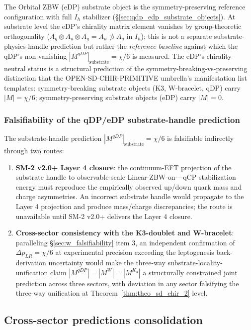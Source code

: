 \documentclass[11pt,letterpaper]{article}
\newcommand{\Kthree}{\ensuremath{K_3}}
\newcommand{\DeltapLR}{\Delta p_{LR}}
\begin{document}
The Orbital ZBW (eDP) substrate object is the symmetry-preserving reference configuration with full $I_h$ stabilizer (\S\ref{sec:qdp_edp_substrate_objects}). At substrate level the eDP's chirality matrix element vanishes by group-theoretic orthogonality ($A_g \otimes A_u \otimes A_g = A_u \not\supset A_g$ in $I_h$); this is not a separate substrate-physics-handle prediction but rather the \emph{reference baseline} against which the qDP's non-vanishing $|M^{qDP}|_{\text{substrate}} = \chi/6$ is measured. The eDP's chirality-neutral status is a structural prediction of the symmetry-breaking-vs-preserving distinction that the OPEN-SD-CHIR-PRIMITIVE umbrella's manifestation list templates: symmetry-breaking substrate objects (K3, W-bracelet, qDP) carry $|M| = \chi/6$; symmetry-preserving substrate objects (eDP) carry $|M| = 0$.

\subsubsection{Falsifiability of the qDP/eDP substrate-handle prediction}\label{sec:qdp_falsifiability}

The substrate-handle prediction $|M^{qDP}|_{\text{substrate}} = \chi/6$ is falsifiable indirectly through two routes:

\begin{enumerate}\setlength\itemsep{0.3em}
    \item \textbf{SM-2 v2.0+ Layer 4 closure}: the continuum-EFT projection of the substrate handle to observable-scale Linear-ZBW-on-$-$qCP stabilization energy must reproduce the empirically observed up/down quark mass and charge asymmetries. An incorrect substrate handle would propagate to the Layer 4 projection and produce mass/charge discrepancies; the route is unavailable until SM-2 v2.0+ delivers the Layer 4 closure.
    \item \textbf{Cross-sector consistency with the K3-doublet and W-bracelet}: paralleling \S\ref{sec:w_falsifiability} item 3, an independent confirmation of $\DeltapLR = \chi/6$ at experimental precision exceeding the leptogenesis back-derivation uncertainty would make the three-way substrate-locality-unification claim $|M^{qDP}| = |M^W| = |M^{\Kthree}|$ a structurally constrained joint prediction across three sectors, with deviation in any sector falsifying the three-way unification at Theorem~\ref{thm:theo_sd_chir_2} level.
\end{enumerate}

\subsection{Cross-sector predictions consolidation}\label{sec:cross_sector_predictions}
\end{document}
